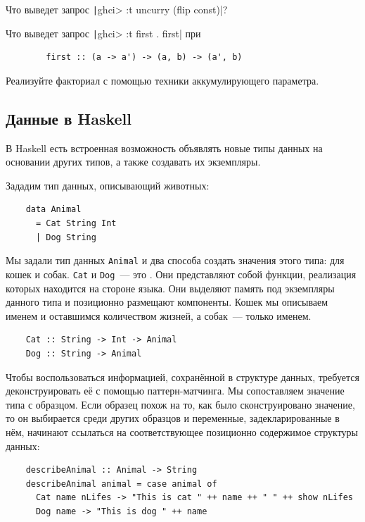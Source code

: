 \begin{task}
    Что выведет запрос \texttt|ghci> :t uncurry (flip const)|?
\end{task}

\begin{task}
    Что выведет запрос \texttt|ghci> :t first . first| при
    \begin{verbatim}
        first :: (a -> a') -> (a, b) -> (a', b)
    \end{verbatim}
\end{task}

\begin{task}
    Реализуйте факториал с помощью техники аккумулирующего параметра.
\end{task}

\subsection{Данные в Haskell}

В Haskell есть встроенная возможность объявлять новые типы данных на основании других типов, а также создавать их экземпляры.

Зададим тип данных, описывающий животных:
\begin{verbatim}
    data Animal
      = Cat String Int
      | Dog String
\end{verbatim}

Мы задали тип данных \texttt{Animal} и два способа создать значения этого типа: для кошек и собак.
\texttt{Cat} и \texttt{Dog}~--- это .
Они представляют собой функции, реализация которых находится на стороне языка.
Они выделяют память под экземпляры данного типа и позиционно размещают компоненты.
Кошек мы описываем именем и оставшимся количеством жизней, а собак~--- только именем.
\begin{verbatim}
    Cat :: String -> Int -> Animal
    Dog :: String -> Animal
\end{verbatim}

Чтобы воспользоваться информацией, сохранённой в структуре данных, требуется деконструировать её с помощью паттерн-матчинга.
Мы сопоставляем значение типа с образцом.
Если образец похож на то, как было сконструировано значение, то он выбирается среди других образцов и переменные, задекларированные в нём, начинают ссылаться на соответствующее позиционно содержимое структуры данных:
\begin{verbatim}
    describeAnimal :: Animal -> String
    describeAnimal animal = case animal of
      Cat name nLifes -> "This is cat " ++ name ++ " " ++ show nLifes
      Dog name -> "This is dog " ++ name
\end{verbatim}

